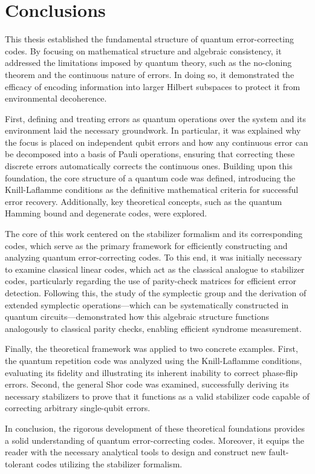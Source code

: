 \chapter{Conclusions}

This thesis established the fundamental structure of quantum error-correcting codes. By focusing on mathematical structure and algebraic consistency, it addressed the limitations imposed by quantum theory, such as the no-cloning theorem and the continuous nature of errors. In doing so, it demonstrated the efficacy of encoding information into larger Hilbert subspaces to protect it from environmental decoherence.

First, defining and treating errors as quantum operations over the system and its environment laid the necessary groundwork. In particular, it was explained why the focus is placed on independent qubit errors and how any continuous error can be decomposed into a basis of Pauli operations, ensuring that correcting these discrete errors automatically corrects the continuous ones. Building upon this foundation, the core structure of a quantum code was defined, introducing the Knill-Laflamme conditions as the definitive mathematical criteria for successful error recovery. Additionally, key theoretical concepts, such as the quantum Hamming bound and degenerate codes, were explored.

The core of this work centered on the stabilizer formalism and its corresponding codes, which serve as the primary framework for efficiently constructing and analyzing quantum error-correcting codes. To this end, it was initially necessary to examine classical linear codes, which act as the classical analogue to stabilizer codes, particularly regarding the use of parity-check matrices for efficient error detection. Following this, the study of the symplectic group and the derivation of extended symplectic operations—which can be systematically constructed in quantum circuits—demonstrated how this algebraic structure functions analogously to classical parity checks, enabling efficient syndrome measurement.

Finally, the theoretical framework was applied to two concrete examples. First, the quantum repetition code was analyzed using the Knill-Laflamme conditions, evaluating its fidelity and illustrating its inherent inability to correct phase-flip errors. Second, the general Shor code was examined, successfully deriving its necessary stabilizers to prove that it functions as a valid stabilizer code capable of correcting arbitrary single-qubit errors.

In conclusion, the rigorous development of these theoretical foundations provides a solid understanding of quantum error-correcting codes. Moreover, it equips the reader with the necessary analytical tools to design and construct new fault-tolerant codes utilizing the stabilizer formalism.
